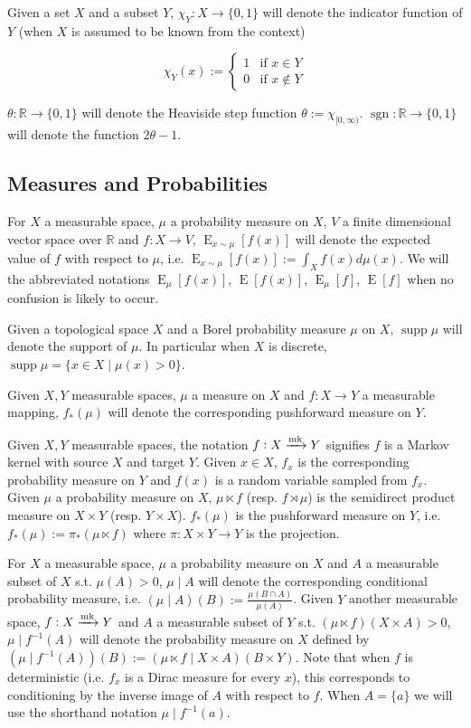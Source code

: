 \documentclass{article}
\numberwithin{equation}{section}
\theoremstyle{definition}
\theoremstyle{plain}
\newcommand{\Bool}{\{0,1\}}
\DeclareMathOperator{\Sgn}{sgn}
\DeclareMathOperator{\Supp}{supp}
\DeclareMathOperator{\E}{E}
\newcommand{\Reals}{\mathbb{R}}
\newcommand{\Markov}{\xrightarrow{\textnormal{mk}}}
\begin{document}
Given a set $X$ and a subset $Y$, $\chi_Y: X \rightarrow \Bool$ will denote the indicator function of $Y$ (when $X$ is assumed to be known from the context)

$$\chi_Y(x):=\begin{cases}1 & \text{if } x \in Y \\ 0 & \text{if } x \not\in Y \end{cases}$$

$\theta: \Reals \rightarrow \Bool$ will denote the Heaviside step function $\theta:=\chi_{[0,\infty)}$. ${\Sgn: \Reals \rightarrow \Bool}$ will denote the function $2 \theta - 1$.
\subsection{Measures and Probabilities}

For $X$ a measurable space, $\mu$ a probability measure on $X$, $V$ a finite dimensional vector space over $\Reals$ and $f: X \rightarrow V$, $\E_{x \sim \mu}[f(x)]$ will denote the expected value of $f$ with respect to $\mu$, i.e. $\E_{x \sim \mu}[f(x)] := \int_X f(x) d\mu(x)$. We will the abbreviated notations $\E_\mu[f(x)]$, $\E[f(x)]$, $\E_\mu[f]$, $\E[f]$ when no confusion is likely to occur.

Given a topological space $X$ and a Borel probability measure $\mu$ on $X$, $\Supp \mu$ will denote the support of $\mu$. In particular when $X$ is discrete, ${\Supp \mu = \{x \in X \mid \mu(x) > 0\}}$.

Given $X,Y$ measurable spaces, $\mu$ a measure on $X$ and $f: X \rightarrow Y$ a measurable mapping, $f_*(\mu)$ will denote the corresponding pushforward measure on $Y$.

Given $X,Y$ measurable spaces, the notation $f: X \xrightarrow{\textnormal{mk}} Y$ signifies $f$ is a Markov kernel with source $X$ and target $Y$. Given $x \in X$, $f_x$ is the corresponding probability measure on $Y$ and $f(x)$ is a random variable sampled from $f_x$. Given $\mu$ a probability measure on $X$, $\mu \ltimes f$ (resp. $f \rtimes \mu$) is the semidirect product measure on $X \times Y$ (resp. $Y \times X$). $f_*(\mu)$ is the pushforward measure on $Y$, i.e. $f_*(\mu):=\pi_*(\mu \ltimes f)$ where $\pi: X \times Y \rightarrow Y$ is the projection.

For $X$ a measurable space, $\mu$ a probability measure on $X$ and $A$ a measurable subset of $X$ s.t. $\mu(A) > 0$, $\mu \mid A$ will denote the corresponding conditional probability measure, i.e. $(\mu \mid A)(B):=\frac{\mu(B \cap A)}{\mu(A)}$. Given $Y$ another measurable space, $f: X \Markov Y$ and $A$ a measurable subset of $Y$ s.t. $(\mu \ltimes f)(X \times A) > 0$, $\mu \mid f^{-1}(A)$ will denote the probability measure on $X$ defined by ${(\mu \mid f^{-1}(A))(B):=(\mu \ltimes f \mid X \times A)(B \times Y)}$. Note that when $f$ is deterministic (i.e. $f_x$ is a Dirac measure for every $x$), this corresponds to conditioning by the inverse image of $A$ with respect to $f$. When $A=\{a\}$ we will use the shorthand notation $\mu \mid f^{-1}(a)$.
\end{document}
